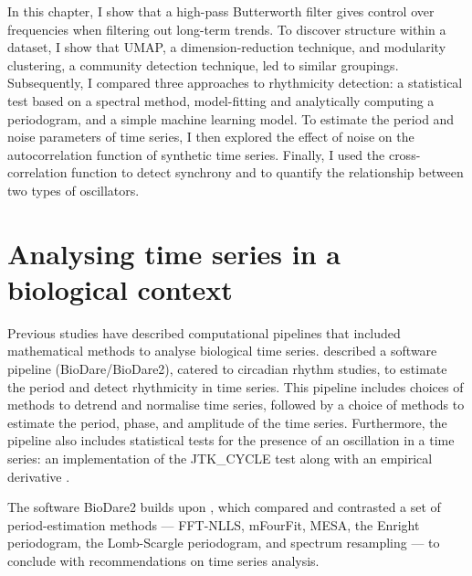 In this chapter, I show that a high-pass Butterworth filter gives control over frequencies when filtering out long-term trends.
To discover structure within a dataset, I show that UMAP, a dimension-reduction technique, and modularity clustering, a community detection technique, led to similar groupings.
Subsequently, I compared three approaches to rhythmicity detection: a statistical test based on a spectral method, model-fitting and analytically computing a periodogram, and a simple machine learning model.
To estimate the period and noise parameters of time series, I then explored the effect of noise on the autocorrelation function of synthetic time series.
Finally, I used the cross-correlation function to detect synchrony and to quantify the relationship between two types of oscillators.

\section{Analysing time series in a biological context}
\label{sec:analysis-literature}

Previous studies have described computational pipelines that included mathematical methods to analyse biological time series.
\textcite{zielinskiPeriodEstimationRhythm2022} described a software pipeline (BioDare/BioDare2), catered to circadian rhythm studies, to estimate the period and detect rhythmicity in time series.
This pipeline includes choices of methods to detrend and normalise time series, followed by a choice of methods to estimate the period, phase, and amplitude of the time series.
Furthermore, the pipeline also includes statistical tests for the presence of an oscillation in a time series: an implementation of the JTK\_CYCLE test \parencite{hughesJTK_CYCLEEfficientNonparametric2010} along with an empirical derivative \parencite{hutchisonImprovedStatisticalMethods2015}.

The software BioDare2 builds upon \textcite{zielinskiStrengthsLimitationsPeriod2014}, which compared and contrasted a set of period-estimation methods ---
FFT-NLLS, mFourFit, MESA, the Enright periodogram, the Lomb-Scargle periodogram, and spectrum resampling --- to conclude with recommendations on time series analysis.

